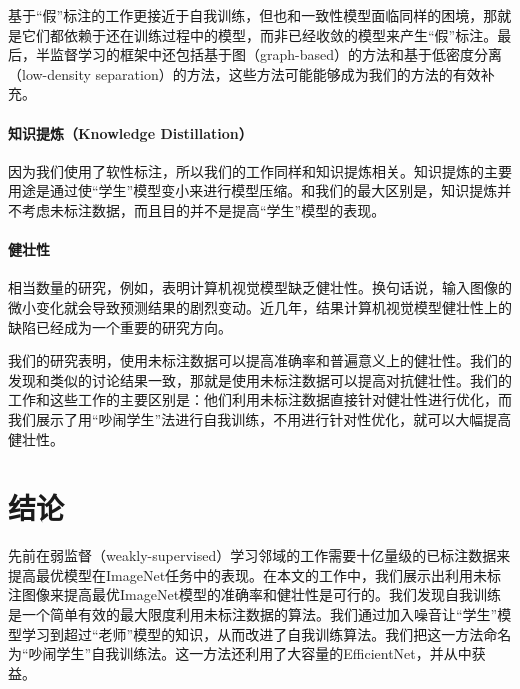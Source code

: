 \documentclass[10pt]{article}
\begin{document}
基于“假”标注的工作\cite{lee2013pseudo,iscen2019label,shi2018transductive,arazo2019pseudo}更接近于自我训练，但也和一致性模型面临同样的困境，那就是它们都依赖于还在训练过程中的模型，而非已经收敛的模型来产生“假”标注。最后，半监督学习的框架中还包括基于图（graph-based）的方法\cite{kingma2014semi,maaloe2016auxiliary,yang2017semi}和基于低密度分离（low-density separation）的方法\cite{grandvalet2005semi,salimans2016improved,dai2017good}，这些方法可能能够成为我们的方法的有效补充。

\paragraph{知识提炼（Knowledge Distillation）}
因为我们使用了软性标注，所以我们的工作同样和知识提炼相关\cite{bucilu2006model,ba2014deep,hinton2015distilling,furlanello2018born}。知识提炼的主要用途是通过使“学生”模型变小来进行模型压缩。和我们的最大区别是，知识提炼并不考虑未标注数据，而且目的并不是提高“学生”模型的表现。  

\paragraph{健壮性}
相当数量的研究，例如\cite{szegedy2013intriguing,hendrycks2018benchmarking,recht2019imagenet,gu2019using}，表明计算机视觉模型缺乏健壮性。换句话说，输入图像的微小变化就会导致预测结果的剧烈变动。近几年，结果计算机视觉模型健壮性上的缺陷已经成为一个重要的研究方向。  


我们的研究表明，使用未标注数据可以提高准确率和普遍意义上的健壮性。我们的发现和类似的讨论\cite{carmon2019unlabeled,stanforth2019labels,najafi2019robustness,zhai2019adversarially}结果一致，那就是使用未标注数据可以提高对抗健壮性。我们的工作和这些工作的主要区别是：他们利用未标注数据直接针对健壮性进行优化，而我们展示了用“吵闹学生”法进行自我训练，不用进行针对性优化，就可以大幅提高健壮性。

\section{结论}
先前在弱监督（weakly-supervised）学习邻域的工作需要十亿量级的已标注数据来提高最优模型在ImageNet任务中的表现。在本文的工作中，我们展示出利用未标注图像来提高最优ImageNet模型的准确率和健壮性是可行的。我们发现自我训练是一个简单有效的最大限度利用未标注数据的算法。我们通过加入噪音让“学生”模型学习到超过“老师”模型的知识，从而改进了自我训练算法。我们把这一方法命名为“吵闹学生”自我训练法。这一方法还利用了大容量的EfficientNet，并从中获益。  
\end{document}
